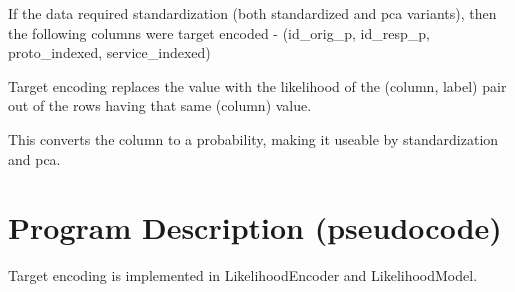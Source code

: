 \documentclass[11pt]{article}
\begin{document}
If the data required standardization (both standardized and pca variants), then the following columns were target encoded - (id\_orig\_p, id\_resp\_p, proto\_indexed, service\_indexed)

Target encoding replaces the value with the likelihood of the (column, label) pair out of the rows having that same (column) value.

This converts the column to a probability, making it useable by standardization and pca.

\section{Program Description (pseudocode)}

Target encoding is implemented in LikelihoodEncoder and LikelihoodModel.
\end{document}
